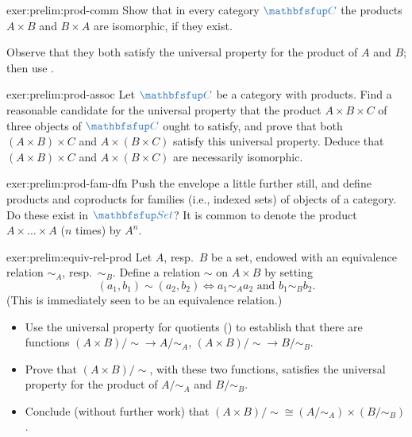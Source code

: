 \begin{exer}{}{exer:prelim:prod-comm}
  Show that in every category $\categ{C}$ the products $A \times B$
  and $B \times A$ are isomorphic, if they exist.
  \begin{hint}
    Observe that they both satisfy the universal property for the
    product of $A$ and $B$; then use
    .
  \end{hint}
\end{exer}

\begin{exer}{}{exer:prelim:prod-assoc}
  Let $\categ{C}$ be a category with products. Find a reasonable
  candidate for the universal property that the product
  $A \times B \times C$ of three objects of $\categ{C}$ ought to
  satisfy, and prove that both $(A \times B) \times C$ and
  $A \times (B \times C)$ satisfy this universal property. Deduce that
  $(A \times B) \times C$ and $A \times (B \times C)$ are necessarily
  isomorphic.
\end{exer}

\begin{exer}{}{exer:prelim:prod-fam-dfn}
  Push the envelope a little further still, and define products and
  coproducts for families (i.e., indexed sets) of objects of a
  category. Do these exist in $\categ{Set}$? It is common to denote
  the product $A \times \dots \times A$ ($n$ times) by $A^n$.
\end{exer}

\begin{exer}{}{exer:prelim:equiv-rel-prod}
  Let $A$, resp.\ $B$ be a set, endowed with an equivalence relation
  $\sim_A$, resp.\ $\sim_B$. Define a relation $\sim$ on $A \times B$
  by setting
  \[
    (a_1, b_1) \sim (a_2, b_2) \iff a_1 \sim_A a_2 \text{ and } b_1
    \sim_B b_2.
  \]
  (This is immediately seen to be an equivalence relation.)
  \begin{itemize}
  \item Use the universal property for quotients
    () to establish that there are
    functions $(A \times B)/{\sim} \to A/{\sim_A}$,
    $(A \times B)/{\sim} \to B/{\sim_B}$.
  \item Prove that $(A \times B)/{\sim}$, with these two functions,
    satisfies the universal property for the product of $A/{\sim_A}$
    and $B/{\sim_B}$.
  \item Conclude (without further work) that
    $(A \times B)/{\sim} \cong (A/{\sim_A}) \times (B/{\sim_B})$.
  \end{itemize}
\end{exer}

